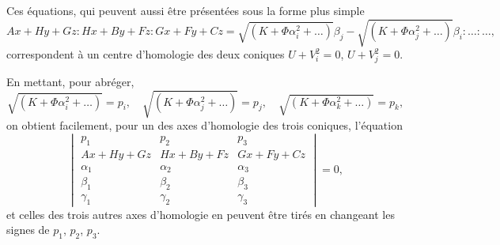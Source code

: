 \documentclass[11pt,a4paper]{book}
\begin{document}
Ces \'{e}quations, qui peuvent aussi \^{e}tre pr\'{e}sent\'{e}es sous la forme plus simple
\begin{equation}\tag{2}
Ax + Hy + Gz : Hx + By + Fz : Gx + Fy + Cz = \sqrt{(K + \Phi\alpha_i^2 + \ldots)}\beta_j - \sqrt{(K + \Phi\alpha_j^2 + \ldots)}\beta_i : \ldots : \ldots,
\end{equation}
correspondent \`{a} un centre d'homologie des deux coniques $U + V_i^2 = 0$, $U + V_j^2 = 0$.

En mettant, pour abr\'{e}ger,
\begin{equation}\tag{3}
\sqrt{(K + \Phi\alpha_i^2 + \ldots)} = p_i, \quad \sqrt{(K + \Phi\alpha_j^2 + \ldots)} = p_j, \quad \sqrt{(K + \Phi\alpha_k^2 + \ldots)} = p_k,
\end{equation}
on obtient facilement, pour un des axes d'homologie des trois coniques, l'\'{e}quation
\begin{equation}\tag{4}
\begin{vmatrix}
p_1 & p_2 & p_3 \\
Ax + Hy + Gz & Hx + By + Fz & Gx + Fy + Cz \\
\alpha_1 & \alpha_2 & \alpha_3 \\
\beta_1 & \beta_2 & \beta_3 \\
\gamma_1 & \gamma_2 & \gamma_3
\end{vmatrix} = 0,
\end{equation}
et celles des trois autres axes d'homologie en peuvent \^{e}tre tir\'{e}s en changeant les signes de $p_1$, $p_2$, $p_3$.
\end{document}
